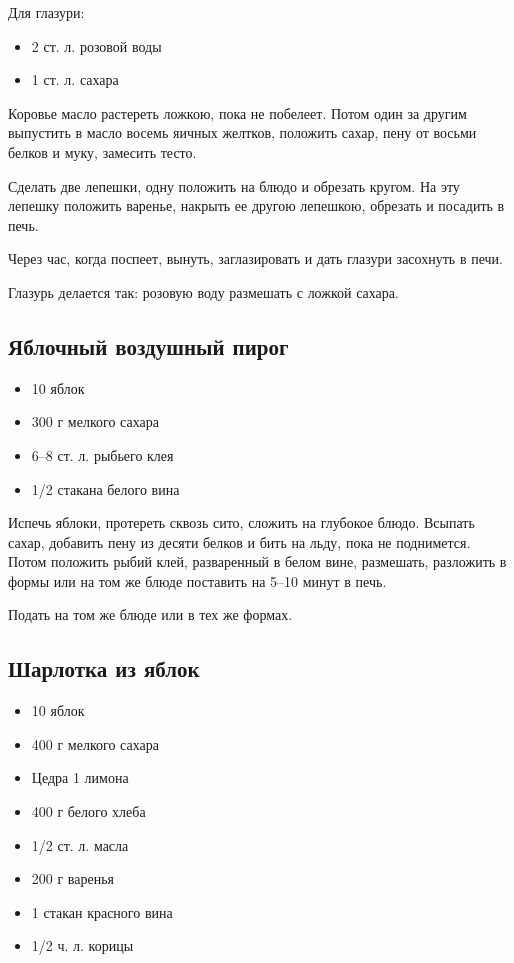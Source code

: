 Для глазури: 

\begin{itemize}
	\item 2 ст. л. розовой воды 
    \item 1 ст. л. сахара
\end{itemize}

Коровье масло растереть ложкою, пока не побелеет. Потом один за другим выпустить в масло восемь яичных желтков, положить сахар, пену от восьми белков и муку, замесить тесто.

Сделать две лепешки, одну положить на блюдо и обрезать кругом. На эту лепешку положить варенье, накрыть ее другою лепешкою, обрезать и посадить в печь.

Через час, когда поспеет, вынуть, заглазировать и дать глазури засохнуть в печи.

Глазурь делается так: розовую воду размешать с ложкой сахара.

\subsection{Яблочный воздушный пирог}

\begin{itemize}
	\item 10 яблок
    \item 300 г мелкого сахара 
    \item 6–8 ст. л. рыбьего клея
    \item 1/2 стакана белого вина
\end{itemize}

Испечь яблоки, протереть сквозь сито, сложить на глубокое блюдо. Всыпать сахар, добавить пену из десяти белков и бить на льду, пока не поднимется. Потом положить рыбий клей, разваренный в белом вине, размешать, разложить в формы или на том же блюде поставить на 5–10 минут в печь.

Подать на том же блюде или в тех же формах.

\subsection{Шарлотка из яблок}

\begin{itemize}
	\item 10 яблок 
    \item 400 г мелкого сахара 
    \item Цедра 1 лимона 
    \item 400 г белого хлеба 
    \item 1/2 ст. л. масла 
    \item 200 г варенья
    \item 1 стакан красного вина 
    \item 1/2 ч. л. корицы
\end{itemize}

